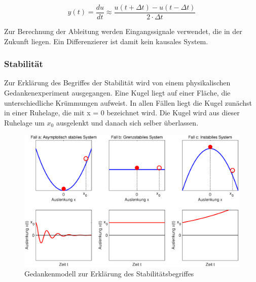 \begin{equation}\label{eq:threefiftythree}
y(t) = \frac{du}{dt} \approx \frac{u\left(t+\Delta t\right)-u\left(t-\Delta t\right)}{2\cdot \Delta t} 
\end{equation}

\noindent Zur Berechnung der Ableitung werden Eingangssignale verwendet, die in der Zukunft liegen. Ein Differenzierer ist damit kein kausales System.

\subsubsection{Stabilität}

Zur Erklärung des Begriffes der Stabilität wird von einem physikalischen Gedankenexperiment ausgegangen.
Eine Kugel liegt auf einer Fläche, die unterschiedliche Krümmungen aufweist. In allen Fällen liegt die Kugel zunächst in einer Ruhelage, die mit x = 0 bezeichnet wird. Die Kugel wird aus dieser Ruhelage um $x_{0}$  ausgelenkt und danach sich selber überlassen.

\begin{figure}[H]
  \centerline{\includegraphics[width=1\textwidth]{Kapitel2/Bilder/image12}}
  \caption{Gedankenmodell zur Erklärung des Stabilitätsbegriffes}
  \label{fig:StabilitaetErklaerung}
\end{figure}

